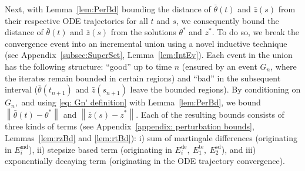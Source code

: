 \documentclass[usenames,dvipsnames,final,12pt]{colt2018} %
\newcommand{\thS}{\theta^*}
\newcommand{\bart}{\bar{\theta}}
\newcommand{\Et}{E_1}
\newcommand{\Ei}{E_i}
\newcommand{\EtT}{\Et^{\te}}
\newcommand{\EiD}{\Ei^{\dt}}
\newcommand{\EiM}{\Ei^{\md}}
\newcommand{\barz}{\bar{z}}
\newcommand{\Ez}{E_2}
\newcommand{\EzS}{\Ez^{\sd}}
\newcommand{\dt}{\text{de}}
\newcommand{\md}{\text{md}}
\newcommand{\sd}{\text{sd}}
\newcommand{\te}{\text{te}}
\newcommand{\norm}[1]{\left\lVert#1\right\rVert}
\newcommand{\zS}{z^*}
\newcommand{\gal}[1]{#1}
\begin{document}
Next, with Lemma~\ref{lem:PerBd} bounding the distance of $\bart(t)$ and $\barz(s)$ from their respective ODE trajectories for all $t$ and $s$, we consequently bound the distance of $\bart(t)$ and $\barz(s)$ from the solutions $\thS$ and $\zS$. To do so, we break the convergence event into an incremental union using a novel inductive technique (see Appendix~\ref{subsec:SuperSet}, Lemma~\ref{lem:IntEv}). Each event in the union has the following structure: ``good'' up to time $n$ (ensured by an event $G_n$, where the iterates remain bounded in certain regions) and ``bad'' in the subsequent interval ($\bart(t_{n+1})$ and $\barz(s_{n+1})$ leave the bounded regions).  By conditioning on $G_n,$ and using \eqref{eq: Gn' definition} with Lemma~\ref{lem:PerBd}, we bound $\norm{\bart(t) - \thS}$ and $\norm{\barz(s) - \zS}.$  Each of the resulting bounds consists of three kinds of terms (see Appendix~\ref{appendix: perturbation bounds},  Lemmas~\ref{lem:rzBd} and \ref{lem:rtBd}): i) sum of martingale differences (originating in $\EiM$), ii) {stepsize based term} (originating in $\EiD,~\EtT,~\EzS$), and iii) {exponentially decaying term} (originating in the ODE trajectory convergence).
\end{document}
